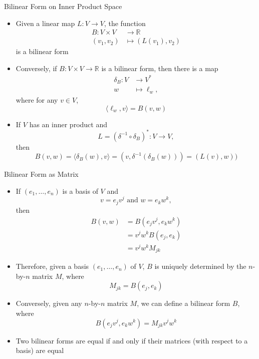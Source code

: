 \documentclass[usenames,dvipsnames,10pt]{beamer}
\newcommand{\R}{\mathbb{R}}
\begin{document}
\begin{frame}
  {Bilinear Form on Inner Product Space}

  \begin{itemize}
  \item Given a linear map $L: V \rightarrow V$, the function
    \begin{align*}
      B: V\times V &\rightarrow \R\\
      (v_1,v_2) &\mapsto (L(v_1),v_2)
    \end{align*}
    is a bilinear form
  \item Conversely, if $B: V\times V\rightarrow \R$ is a bilinear form, then there is a map
    \begin{align*}
      \delta_B: V &\rightarrow V^*\\
      w &\mapsto \ell_w,
    \end{align*}
    where for any $v \in V$,
    \[ \langle\ell_w,v\rangle = B(v,w) \]
  \item If $V$ has an inner product and
    \[ L = (\delta^{-1}\circ\delta_B)^*: V \rightarrow V, \]
    then
    \[
      B(v,w) = \langle\delta_B(w),v\rangle = (v,\delta^{-1}(\delta_B(w))) = (L(v),w))
    \]
  \end{itemize}
\end{frame}

\begin{frame}
  {Bilinear Form as Matrix}

  \begin{itemize}
  \item If $(e_1, \dots, e_n)$ is a basis of $V$ and
    \[ v = e_jv^j\text{ and }w = e_kw^k, \]
    then
    \begin{align*}
      B(v,w) &= B(e_jv^j, e_kw^k)\\
             &= v^jw^kB(e_j,e_k)\\
             &= v^jw^kM_{jk}
    \end{align*}
  \item Therefore, given a basis $(e_1, \dots, e_n)$ of $V$, $B$ is uniquely determined by the $n$-by-$n$ matrix $M$, where
    \[ M_{jk} = B(e_j,e_k) \]
  \item Conversely, given any $n$-by-$n$ matrix $M$, we can define a bilinear form $B$, where
    \[
      B(e_jv^j,e_kw^k) = M_{jk}v^jw^k
    \]
  \item Two bilinear forms are equal if and only if their matrices (with respect to a basis) are equal
  \end{itemize}
\end{frame}
\end{document}
